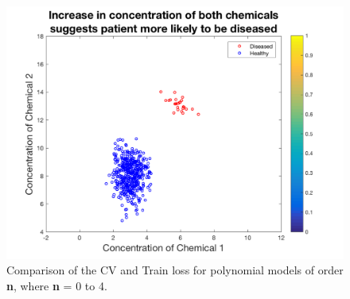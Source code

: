 \begin{figure}[h]
	\centering
	\includegraphics[width=0.8\linewidth]{images/MLtrainingData}
	\caption{Comparison of the CV and Train loss for polynomial models of order \textbf{n}, where \textbf{n} = 0 to 4.}
	\label{fig:CVT4}
\end{figure}

